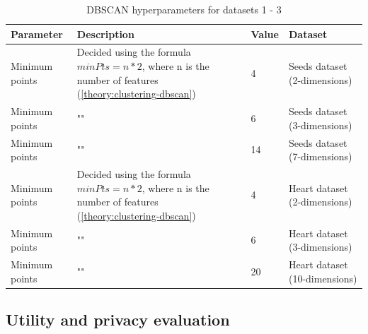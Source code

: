 \begin{table}[h]
  \begin{tabular}{|l|p{6cm}|l|l|}
    \hline
    Parameter      & Description                                                                                                    & Value & Dataset                       \\
    \hline
    Minimum points & Decided using the formula $minPts = n * 2$, where n is the number of features (\ref{theory:clustering-dbscan}) & 4     & Seeds dataset (2-dimensions)  \\
    \hline
    Minimum points & ""                                                                                                             & 6     & Seeds dataset (3-dimensions)  \\
    \hline
    Minimum points & ""                                                                                                             & 14    & Seeds dataset (7-dimensions)  \\
    \hline
    Minimum points & Decided using the formula $minPts = n * 2$, where n is the number of features (\ref{theory:clustering-dbscan}) & 4     & Heart dataset (2-dimensions)  \\
    \hline
    Minimum points & ""                                                                                                             & 6     & Heart dataset (3-dimensions)  \\
    \hline
    Minimum points & ""                                                                                                             & 20    & Heart dataset (10-dimensions) \\
    \hline
  \end{tabular}
  \caption{DBSCAN  hyperparameters for datasets 1 - 3}
  \label{tab:dbscan-formula-sklearn}
\end{table}

\newpage
\subsection{Utility and privacy evaluation}
